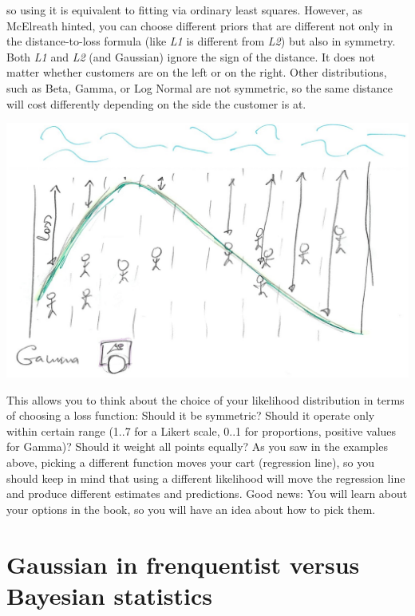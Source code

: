 \documentclass[
]{book}
\begin{document}
so using it is equivalent to fitting via ordinary least squares. However, as McElreath hinted, you can choose different priors that are different not only in the distance-to-loss formula (like \emph{L1} is different from \emph{L2}) but also in symmetry. Both \emph{L1} and \emph{L2} (and Gaussian) ignore the sign of the distance. It does not matter whether customers are on the left or on the right. Other distributions, such as Beta, Gamma, or Log Normal are not symmetric, so the same distance will cost differently depending on the side the customer is at.

\begin{center}\includegraphics[width=1\linewidth]{images/loss-functions-Gamma} \end{center}

This allows you to think about the choice of your likelihood distribution in terms of choosing a loss function: Should it be symmetric? Should it operate only within certain range (1..7 for a Likert scale, 0..1 for proportions, positive values for Gamma)? Should it weight all points equally? As you saw in the examples above, picking a different function moves your cart (regression line), so you should keep in mind that using a different likelihood will move the regression line and produce different estimates and predictions. Good news: You will learn about your options in the book, so you will have an idea about how to pick them.

\hypertarget{gaussian-in-frenquentist-versus-bayesian-statistics}{%
\section{Gaussian in frenquentist versus Bayesian statistics}\label{gaussian-in-frenquentist-versus-bayesian-statistics}}
\end{document}
